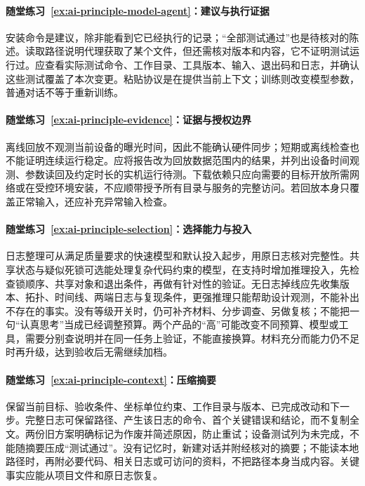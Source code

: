 \paragraph*{随堂练习~\ref{ex:ai-principle-model-agent}：建议与执行证据}
\begin{solution}
安装命令是建议，除非能看到它已经执行的记录；“全部测试通过”也是待核对的陈述。读取路径说明代理获取了某个文件，但还需核对版本和内容，它不证明测试运行过。应查看实际测试命令、工作目录、工具版本、输入、退出码和日志，并确认这些测试覆盖了本次变更。粘贴协议是在提供当前上下文；训练则改变模型参数，普通对话不等于重新训练。
\end{solution}

\paragraph*{随堂练习~\ref{ex:ai-principle-evidence}：证据与授权边界}
\begin{solution}
离线回放不观测当前设备的曝光时间，因此不能确认硬件同步；短期或离线检查也不能证明连续运行稳定。应将报告改为回放数据范围内的结果，并列出设备时间观测、参数读回及约定时长的实机运行待测。下载依赖只应向需要的目标开放所需网络或在受控环境安装，不应顺带授予所有目录与服务的完整访问。若回放本身只覆盖正常输入，还应补充异常输入检查。
\end{solution}

\paragraph*{随堂练习~\ref{ex:ai-principle-selection}：选择能力与投入}
\begin{solution}
日志整理可从满足质量要求的快速模型和默认投入起步，用原日志核对完整性。共享状态与疑似死锁可选能处理复杂代码约束的模型，在支持时增加推理投入，先检查锁顺序、共享对象和退出条件，再做有针对性的验证。无日志掉线应先收集版本、拓扑、时间线、两端日志与复现条件，更强推理只能帮助设计观测，不能补出不存在的事实。没有等级开关时，仍可补齐材料、分步调查、另做复核；不能把一句“认真思考”当成已经调整预算。两个产品的“高”可能改变不同预算、模型或工具，需要分别查说明并在同一任务上验证，不能直接换算。材料充分而能力仍不足时再升级，达到验收后无需继续加档。
\end{solution}

\paragraph*{随堂练习~\ref{ex:ai-principle-context}：压缩摘要}
\begin{solution}
保留当前目标、验收条件、坐标单位约束、工作目录与版本、已完成改动和下一步。完整日志可保留路径、产生该日志的命令、首个关键错误和结论，而不复制全文。两份旧方案明确标记为作废并简述原因，防止重试；设备测试列为未完成，不能随摘要压成“测试通过”。没有记忆时，新建对话并附经核对的摘要；不能读本地路径时，再附必要代码、相关日志或可访问的资料，不把路径本身当成内容。关键事实应能从项目文件和原日志恢复。
\end{solution}

